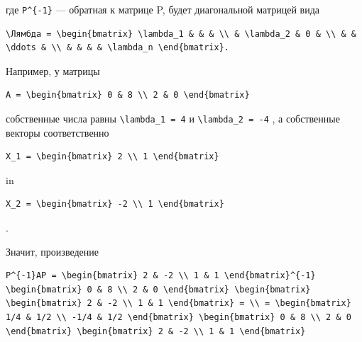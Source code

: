 \documentclass[
  ukrainian,
]{article}
\begin{document}
где \texttt{P\^{}\{-1\}} --- обратная к матрице P, будет диагональной
матрицей вида

\begin{verbatim}
\Лямбда = \begin{bmatrix} \lambda_1 & & & \\ & \lambda_2 & 0 & \\ & & \ddots & \\ & & & & \lambda_n \end{bmatrix}.
\end{verbatim}

Например, у матрицы

\begin{verbatim}
A = \begin{bmatrix} 0 & 8 \\ 2 & 0 \end{bmatrix}
\end{verbatim}

собственные числа равны \texttt{\textbackslash{}lambda\_1\ =\ 4} и
\texttt{\textbackslash{}lambda\_2\ =\ -4} , а собственные векторы
соответственно

\begin{verbatim}
X_1 = \begin{bmatrix} 2 \\ 1 \end{bmatrix}
\end{verbatim}

in

\begin{verbatim}
X_2 = \begin{bmatrix} -2 \\ 1 \end{bmatrix}
\end{verbatim}

.

Значит, произведение

\begin{verbatim}
P^{-1}AP = \begin{bmatrix} 2 & -2 \\ 1 & 1 \end{bmatrix}^{-1} \begin{bmatrix} 0 & 8 \\ 2 & 0 \end{bmatrix} \begin{bmatrix} \begin{bmatrix} 2 & -2 \\ 1 & 1 \end{bmatrix} = \\ = \begin{bmatrix} 1/4 & 1/2 \\ -1/4 & 1/2 \end{bmatrix} \begin{bmatrix} 0 & 8 \\ 2 & 0 \end{bmatrix} \begin{bmatrix} 2 & -2 \\ 1 & 1 \end{bmatrix}
\end{verbatim}
\end{document}
